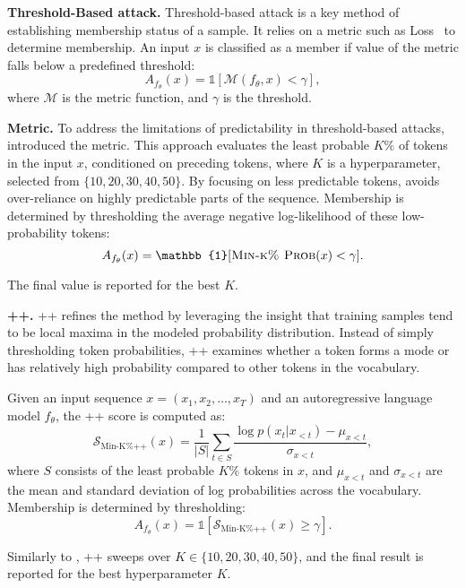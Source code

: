 \textbf{Threshold-Based attack.} 
Threshold-based attack is a key method of establishing membership status of a sample. 
It relies on a metric such as Loss~\citep{yeom2018lossmia} to determine membership. An input $x$ is classified as a member if value of the metric falls below a predefined threshold:
\begin{equation}
A_{f_\theta}(x) = \mathbb{1}[\mathcal{M}(f_\theta, x) < \gamma],
\label{eq:mia_thr}
\end{equation}
where $\mathcal{M}$ is the metric function, and $\gamma$ is the threshold. 

\textbf{\mink Metric.} 
To address the limitations of predictability in threshold-based attacks, \citet{shi2024detecting} introduced the \mink metric. This approach evaluates the least probable $ K\% $ of tokens in the input $ x $, conditioned on preceding tokens{, where $K$ is a hyperparameter, selected from $\{10,20,30,40,50\}$}. By focusing on less predictable tokens, \mink avoids over-reliance on highly predictable parts of the sequence. Membership is determined by thresholding the average negative log-likelihood of these low-probability tokens:
\[
A_{\fmodelm}(x) = \mathbb{1}[\mink(x) < \gamma].
\]

{The final value is reported for the best $K$.}

\textbf{\mink++.}  
\mink++ refines the \mink method by leveraging the insight that training samples tend to be local maxima in the modeled probability distribution. Instead of simply thresholding token probabilities, \mink++ examines whether a token forms a mode or has relatively high probability compared to other tokens in the vocabulary.

Given an input sequence $x = (x_1, x_2, \dots, x_T)$ and an autoregressive language model $f_\theta$, the \mink++ score is computed as:
\begin{equation}
\mathcal{S}_{\text{Min-K\%++}}(x) = \frac{1}{|S|} \sum_{t \in S} \frac{\log p(x_t | x_{<t}) - \mu_{x<t}}{\sigma_{x<t}},
\end{equation}
where $S$ consists of the least probable $K\%$ tokens in $x$, and $\mu_{x<t}$ and $\sigma_{x<t}$ are the mean and standard deviation of log probabilities across the vocabulary. Membership is determined by thresholding:
\begin{equation}
A_{f_\theta}(x) = \mathbb{1}[\mathcal{S}_{\text{Min-K\%++}}(x) \geq \gamma].
\end{equation}

{Similarly to \mink, \mink++ sweeps over $K\in\{10,20,30,40,50\}$, and the final result is reported for the best hyperparameter $K$.}


